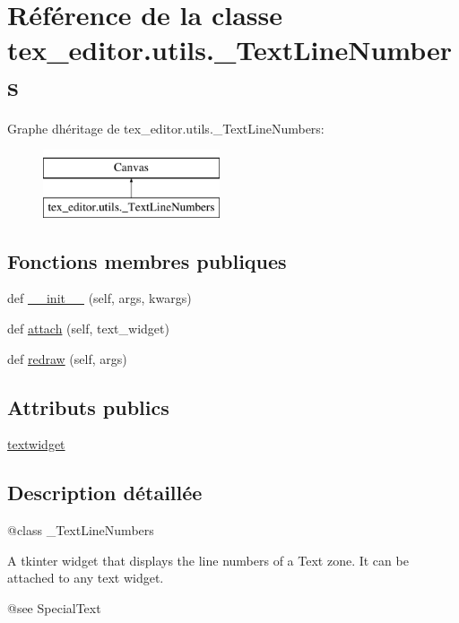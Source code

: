 \hypertarget{classtex__editor_1_1utils_1_1___text_line_numbers}{}\section{Référence de la classe tex\+\_\+editor.\+utils.\+\_\+\+Text\+Line\+Numbers}
\label{classtex__editor_1_1utils_1_1___text_line_numbers}
Graphe d\textquotesingle{}héritage de tex\+\_\+editor.\+utils.\+\_\+\+Text\+Line\+Numbers\+:\begin{figure}[H]
\begin{center}
\leavevmode
\includegraphics[height=2.000000cm]{classtex__editor_1_1utils_1_1___text_line_numbers}
\end{center}
\end{figure}
\subsection*{Fonctions membres publiques}
\begin{DoxyCompactItemize}
\item 
def \hyperlink{classtex__editor_1_1utils_1_1___text_line_numbers_af251872af54e4cf0cb4507bb2aaebfb2}{\+\_\+\+\_\+init\+\_\+\+\_\+} (self, args, kwargs)
\item 
def \hyperlink{classtex__editor_1_1utils_1_1___text_line_numbers_abe5fcdc8aa28a2506d28e31f90e55dad}{attach} (self, text\+\_\+widget)
\item 
def \hyperlink{classtex__editor_1_1utils_1_1___text_line_numbers_a791618e64f898ba331f0ede58ce4f0be}{redraw} (self, args)
\end{DoxyCompactItemize}
\subsection*{Attributs publics}
\begin{DoxyCompactItemize}
\item 
\hyperlink{classtex__editor_1_1utils_1_1___text_line_numbers_afe4b9ad6310abd726459950d1bc83882}{textwidget}
\end{DoxyCompactItemize}


\subsection{Description détaillée}
\begin{DoxyVerb}@class _TextLineNumbers

A tkinter widget that displays the line numbers of a Text zone.
It can be attached to any text widget.

@see SpecialText
\end{DoxyVerb}
 

